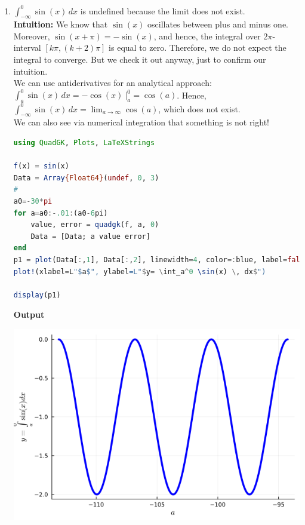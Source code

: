\begin{enumerate}
    \item \Ans \quad $\int_{-\infty} ^0 \sin(x) \, dx$ is undefined because the limit does not exist.\\

    \textbf{Intuition:} We know that $\sin(x)$ oscillates between plus and minus one. Moreover, $\sin(x+\pi) = -\sin(x)$, and hence, the integral over $2 \pi$-interval $[k\pi, (k+2)\pi]$ is equal to zero. Therefore, we do not expect the integral to converge. But we check it out anyway, just to confirm our intuition. \\

    We can use antiderivatives for an analytical approach: $\int_{a} ^0 \sin(x) \, dx = -\cos(x)~\bigg|_a^0 = \cos(a)$. Hence, $\int_{-\infty} ^0 \sin(x) \, dx = \displaystyle \lim_{a \to \infty } \cos(a)$, which does not exist.\\

    We can also see via numerical integration that something is not right!     
\begin{lstlisting}[language=Julia,style=mystyle]
using QuadGK, Plots, LaTeXStrings
    
f(x) = sin(x)
Data = Array{Float64}(undef, 0, 3)
#
a0=-30*pi
for a=a0:-.01:(a0-6pi)
    value, error = quadgk(f, a, 0)
    Data = [Data; a value error]
end
p1 = plot(Data[:,1], Data[:,2], linewidth=4, color=:blue, label=false)
plot!(xlabel=L"$a$", ylabel=L"$y= \int_a^0 \sin(x) \, dx$") 

display(p1)
\end{lstlisting}
\textbf{Output} 

   \begin{center}
    \includegraphics[width=0.45\columnwidth]{graphics/Chap04/ImproperIntegralSine.png}
    \end{center}

   
\end{enumerate}

    \Qed



\bigskip


